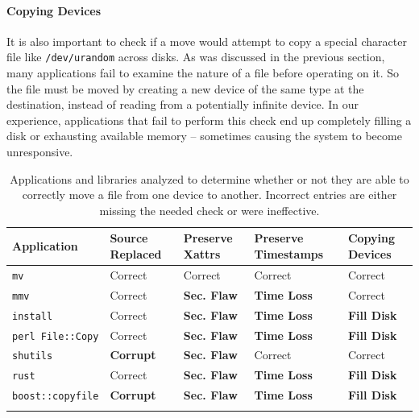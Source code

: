 \paragraph{Copying Devices}

It is also important to check if a move would attempt to copy a special
character file like {\tt /dev/urandom} across disks.  As was discussed in
the previous section, many applications fail to examine the nature of a
file before operating on it.  So the file must be moved by creating a new
device of the same type at the destination, instead of reading from a
potentially infinite device.  In our experience, applications that fail to
perform this check end up completely filling a disk or exhausting available
memory -- sometimes causing the system to become unresponsive.

 \begin{table}[t]
    \scriptsize{}
    \begin{tabular}{l p{1cm} p{1cm} p{1.2cm} p{1cm}}
    \toprule{}
        Application     & Source Replaced & Preserve Xattrs & Preserve Timestamps & Copying Devices\\
\hline
        {\tt mv}              & Correct             & Correct         & Correct             & Correct\\
        {\tt mmv}             & Correct             & {\bf Sec. Flaw} & {\bf Time Loss} & Correct\\
        {\tt install}         & Correct             & {\bf Sec. Flaw} & {\bf Time Loss} & {\bf Fill Disk} \\
        {\tt perl File::Copy} & Correct             & {\bf Sec. Flaw} & {\bf Time Loss} & {\bf Fill Disk} \\
        {\tt shutils}         & {\bf Corrupt}	& {\bf Sec. Flaw} 	& Correct             & Correct\\
        {\tt rust}             & Correct             & {\bf Sec. Flaw} & {\bf Time Loss} & {\bf Fill Disk} \\
        {\tt boost::copyfile} & {\bf Corrupt}	      & {\bf Sec. Flaw} & {\bf Time Loss} & {\bf Fill Disk} \\
    \bottomrule{}
    \end{tabular}
    \caption{Applications and libraries analyzed to determine whether or not
      they are able to correctly move a file from one device to another.
Incorrect entries are either missing the needed check or were ineffective.}
    \label{table:crossdevice}
\end{table}

